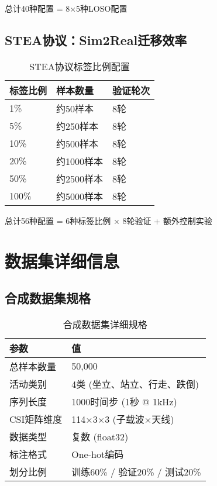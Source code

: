 总计40种配置 = 8×5种LOSO配置

\subsection{STEA协议：Sim2Real迁移效率}
\label{app:stea_protocol}

\begin{table}[h]
\centering
\caption{STEA协议标签比例配置}
\label{tab:stea_label_ratios}
\begin{tabular}{lll}
\toprule
\textbf{标签比例} & \textbf{样本数量} & \textbf{验证轮次} \\
\midrule
1\% & 约50样本 & 8轮 \\
5\% & 约250样本 & 8轮 \\
10\% & 约500样本 & 8轮 \\
20\% & 约1000样本 & 8轮 \\
50\% & 约2500样本 & 8轮 \\
100\% & 约5000样本 & 8轮 \\
\bottomrule
\end{tabular}
\end{table}

总计56种配置 = 6种标签比例 × 8轮验证 + 额外控制实验

\section{数据集详细信息}
\label{app:dataset_details}

\subsection{合成数据集规格}
\label{app:synthetic_specs}

\begin{table}[h]
\centering
\caption{合成数据集详细规格}
\label{tab:synthetic_dataset_specs}
\begin{tabular}{ll}
\toprule
\textbf{参数} & \textbf{值} \\
\midrule
总样本数量 & 50,000 \\
活动类别 & 4类 (坐立、站立、行走、跌倒) \\
序列长度 & 1000时间步 (1秒 @ 1kHz) \\
CSI矩阵维度 & 114×3×3 (子载波×天线) \\
数据类型 & 复数 (float32) \\
标注格式 & One-hot编码 \\
划分比例 & 训练60\% / 验证20\% / 测试20\% \\
\bottomrule
\end{tabular}
\end{table}

